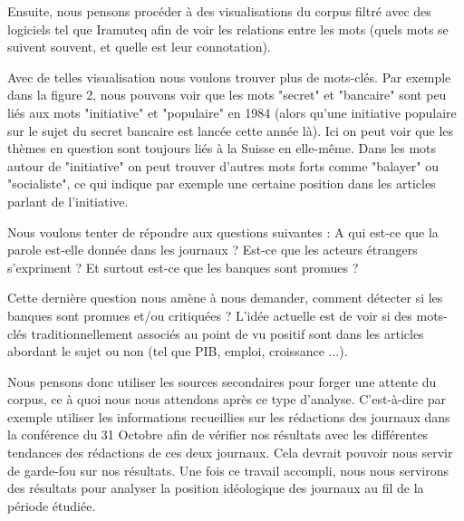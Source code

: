 \documentclass[11pt]{article}
\begin{document}
Ensuite, nous pensons procéder à des visualisations du corpus filtré avec des
logiciels tel que Iramuteq afin de voir les relations entre les mots (quels mots
se suivent souvent, et quelle est leur connotation).

Avec de telles visualisation nous voulons trouver plus de mots-clés. 
Par exemple dans la figure 2, nous pouvons voir que
les mots "secret" et "bancaire" sont peu liés aux mots "initiative" et "populaire" en 1984
(alors qu'une initiative populaire sur le sujet du secret
bancaire est lancée cette année là). Ici on peut voir que les thèmes en question sont toujours liés à la
Suisse en elle-même. Dans les mots autour de "initiative" on peut trouver
d'autres mots forts comme "balayer" ou "socialiste", ce qui indique par exemple
une certaine position dans les articles parlant de l'initiative.

Nous voulons tenter de répondre aux questions suivantes : A qui est-ce que la
parole est-elle donnée dans les journaux ? Est-ce que les acteurs étrangers
s'expriment ? Et surtout est-ce que les banques sont promues ?

Cette dernière question nous amène à nous demander, comment détecter si les
banques sont promues et/ou critiquées ? L'idée actuelle est de voir si des
mots-clés traditionnellement associés au point de vu positif sont dans les
articles abordant le sujet ou non (tel que PIB, emploi, croissance ...).
    
Nous pensons donc utiliser les sources secondaires pour forger une attente du
corpus, ce à quoi nous nous attendons après ce type d’analyse. C’est-à-dire
par exemple utiliser les informations recueillies sur les rédactions des
journaux dans la conférence du 31 Octobre \citep{ConfClass1} afin de vérifier 
nos résultats avec les
différentes tendances des rédactions de ces deux journaux. Cela devrait pouvoir
nous servir de garde-fou sur nos résultats. Une fois ce travail accompli, nous
nous servirons des résultats pour analyser la position idéologique des journaux
au fil de la période étudiée. 

\newpage



\end{document}
